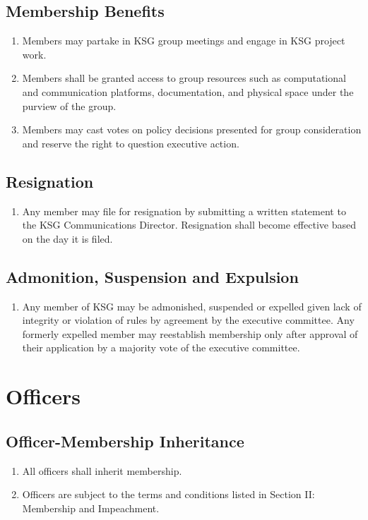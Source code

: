 \documentclass[12pt,executivepaper]{article}
\begin{document}
\subsection{Membership Benefits}
\begin{enumerate}
    \item Members may partake in KSG group meetings and engage in KSG project work.
    \item Members shall be granted access to group resources such as computational
          and communication platforms, documentation, and physical space under the
          purview of the group.
    \item Members may cast votes on policy decisions presented for group consideration
          and reserve the right to question executive action.
\end{enumerate}

\subsection{Resignation}
\begin{enumerate}
    \item Any member may file for resignation by submitting a written statement to
          the KSG Communications Director. Resignation shall become effective based
          on the day it is filed.
\end{enumerate}

\subsection{Admonition, Suspension and Expulsion}
\begin{enumerate}
    \item Any member of KSG may be admonished, suspended or expelled given lack of
          integrity or violation of rules by agreement by the executive committee.
          Any formerly expelled member may reestablish membership only after approval
          of their application by a majority vote of the executive committee.
\end{enumerate}

\section{Officers}

\subsection{Officer-Membership Inheritance}
\begin{enumerate}
    \item All officers shall inherit membership.
    \item Officers are subject to the terms and conditions listed in Section II:
          Membership and Impeachment.
\end{enumerate}
\end{document}
